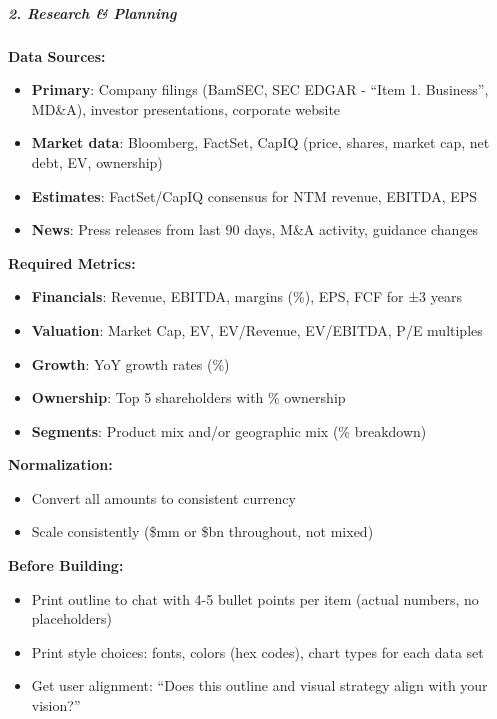 \documentclass[11pt]{article}
\begin{document}
\subparagraph{2. Research \& Planning}\mbox{}\par
\textbf{Data Sources:}

\begin{itemize}[leftmargin=*,itemsep=2pt,topsep=2pt]
\item {} \textbf{Primary}: Company filings (BamSEC, SEC EDGAR - ``Item 1. Business'', MD\&A), investor presentations, corporate website
\item {} \textbf{Market data}: Bloomberg, FactSet, CapIQ (price, shares, market cap, net debt, EV, ownership)
\item {} \textbf{Estimates}: FactSet/CapIQ consensus for NTM revenue, EBITDA, EPS
\item {} \textbf{News}: Press releases from last 90 days, M\&A activity, guidance changes
\end{itemize}

\textbf{Required Metrics:}

\begin{itemize}[leftmargin=*,itemsep=2pt,topsep=2pt]
\item {} \textbf{Financials}: Revenue, EBITDA, margins (\%), EPS, FCF for ±3 years
\item {} \textbf{Valuation}: Market Cap, EV, EV/Revenue, EV/EBITDA, P/E multiples
\item {} \textbf{Growth}: YoY growth rates (\%)
\item {} \textbf{Ownership}: Top 5 shareholders with \% ownership
\item {} \textbf{Segments}: Product mix and/or geographic mix (\% breakdown)
\end{itemize}

\textbf{Normalization:}

\begin{itemize}[leftmargin=*,itemsep=2pt,topsep=2pt]
\item {} Convert all amounts to consistent currency
\item {} Scale consistently (\$mm or \$bn throughout, not mixed)
\end{itemize}

\textbf{Before Building:}

\begin{itemize}[leftmargin=*,itemsep=2pt,topsep=2pt]
\item {} Print outline to chat with 4-5 bullet points per item (actual numbers, no placeholders)
\item {} Print style choices: fonts, colors (hex codes), chart types for each data set
\item {} Get user alignment: ``Does this outline and visual strategy align with your vision?''
\end{itemize}
\end{document}
